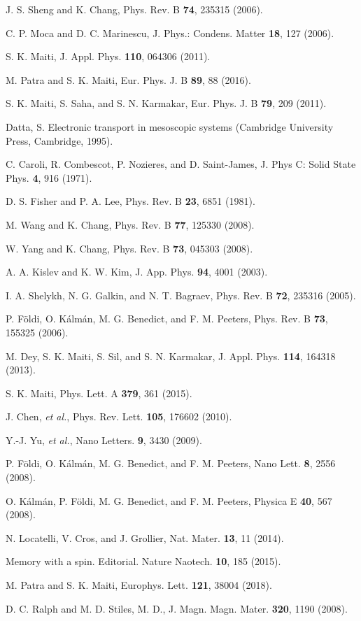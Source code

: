 \documentclass[doublecol]{epl2}
\begin{document}
\begin{thebibliography}{0}
 J. S. Sheng and K. Chang, Phys. Rev. B \textbf{74}, 
235315 (2006).

 C. P. Moca and D. C. Marinescu, J. Phys.: Condens. Matter
\textbf{18}, 127 (2006).

 S. K. Maiti, J. Appl. Phys. \textbf{110}, 064306 (2011).

 M. Patra and S. K. Maiti, Eur. Phys. J. B \textbf{89}, 
88 (2016).

 S. K. Maiti, S. Saha, and S. N. Karmakar, Eur. Phys. J.
B \textbf{79}, 209 (2011).

 Datta, S. Electronic transport in mesoscopic systems
(Cambridge University Press, Cambridge, 1995).

 C. Caroli, R. Combescot, P. Nozieres, and D. Saint-James, 
J. Phys C: Solid State Phys. \textbf{4}, 916 (1971).

 D. S. Fisher and P. A. Lee, Phys. Rev. B \textbf{23}, 6851 (1981).

 M. Wang and K. Chang, Phys. Rev. B \textbf{77}, 125330 (2008).

 W. Yang and K. Chang, Phys. Rev. B \textbf{73}, 045303 
(2008).

 A. A. Kislev and K. W. Kim, J. App. Phys. \textbf{94}, 4001
(2003).

 I. A. Shelykh, N. G. Galkin, and N. T. Bagraev,
Phys. Rev. B \textbf{72}, 235316 (2005).

 P. F\"{o}ldi, O. K\'{a}lm\'{a}n, M. G. Benedict, and
F. M. Peeters, Phys. Rev. B \textbf{73}, 155325 (2006).

 M. Dey, S. K. Maiti, S. Sil, and S. N. Karmakar, 
J. Appl. Phys. \textbf{114}, 164318 (2013).

 S. K. Maiti, Phys. Lett. A \textbf{379}, 361 (2015). 

 J. Chen, {\it et al.}, Phys. Rev. Lett. \textbf{105},
176602 (2010).

 Y.-J. Yu, {\it et al.}, Nano Letters. \textbf{9},
3430 (2009).

 P. F\"{o}ldi, O. K\'{a}lm\'{a}n, M. G. Benedict, and
F. M. Peeters, Nano Lett. \textbf{8}, 2556 (2008).

 O. K\'{a}lm\'{a}n, P. F\"{o}ldi, M. G. Benedict, and
F. M. Peeters, Physica E \textbf{40}, 567 (2008).

 N. Locatelli, V. Cros, and J. Grollier, Nat. Mater.
\textbf{13}, 11 (2014).

 Memory with a spin. Editorial. Nature Naotech. \textbf{10},
185 (2015).

 M. Patra and S. K. Maiti, Europhys. Lett. \textbf{121}, 
38004 (2018).

 D. C. Ralph and M. D. Stiles, M. D., J. Magn. Magn.
Mater. \textbf{320}, 1190 (2008).

\end{thebibliography}
\end{document}
